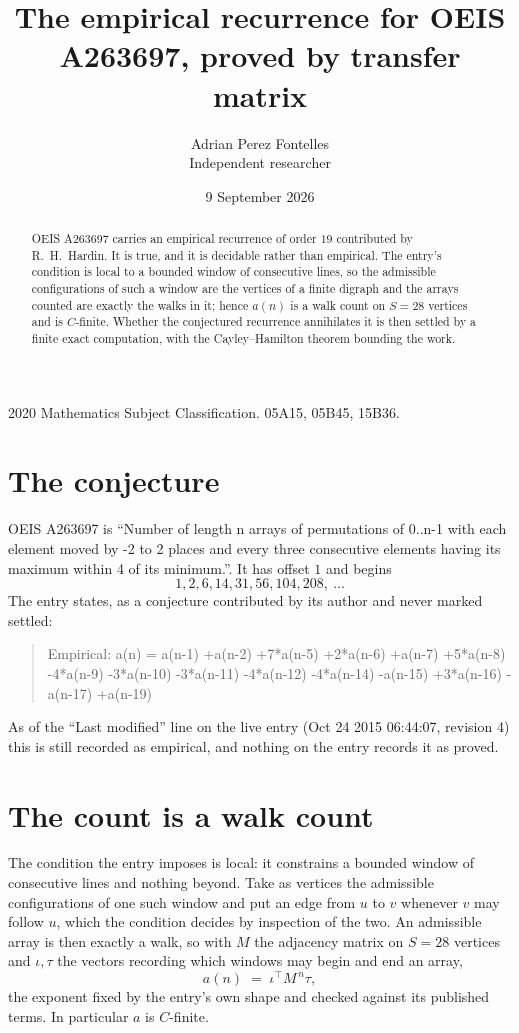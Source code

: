 \documentclass[11pt,a4paper]{article}
\title{The empirical recurrence for OEIS A263697, proved by transfer matrix}
\author{Adrian Perez Fontelles\\ \small Independent researcher}
\date{9 September 2026}
\theoremstyle{plain}
\theoremstyle{definition}
\begin{document}
\maketitle

\begin{abstract}
OEIS A263697 carries an empirical recurrence of order $19$ contributed by R.~H.~Hardin. It is
true, and it is decidable rather than empirical. The entry's condition is local to a bounded window of consecutive lines, so
the admissible configurations of such a window are the vertices of a finite digraph and the
arrays counted are exactly the walks in it; hence $a(n)$ is a walk count on $S=28$ vertices
and is $C$-finite. Whether the conjectured recurrence annihilates it is then settled by a
finite exact computation, with the Cayley--Hamilton theorem bounding the work.
\end{abstract}

\noindent\small 2020 Mathematics Subject Classification. 05A15, 05B45, 15B36.\normalsize

\section{The conjecture}

OEIS A263697 is ``Number of length n arrays of permutations of 0..n-1 with each element moved by -2 to 2 places and every three consecutive elements having its maximum within 4 of its minimum.''. It has offset $1$ and begins
\[
1, 2, 6, 14, 31, 56, 104, 208,\ \dots
\]
The entry states, as a conjecture contributed by its author and never marked settled:
\begin{quote}
Empirical: a(n) = a(n-1) +a(n-2) +7*a(n-5) +2*a(n-6) +a(n-7) +5*a(n-8) -4*a(n-9) -3*a(n-10) -3*a(n-11) -4*a(n-12) -4*a(n-14) -a(n-15) +3*a(n-16) -a(n-17) +a(n-19)
\end{quote}
As of the ``Last modified'' line on the live entry (Oct 24 2015 06:44:07, revision 4) this is still
recorded as empirical, and nothing on the entry records it as proved.

\section{The count is a walk count}

The condition the entry imposes is local: it constrains a bounded window of consecutive lines and nothing beyond. Take as
vertices the admissible configurations of one such window and put an edge from $u$ to $v$
whenever $v$ may follow $u$, which the condition decides by inspection of the two. An
admissible array is then exactly a walk, so with $M$ the adjacency matrix on $S=28$ vertices
and $\iota,\tau$ the vectors recording which windows may begin and end an array,
\[
a(n)\;=\;\iota^{\!\top}M^{\,n}\tau ,
\]
the exponent fixed by the entry's own shape and checked against its published terms. In
particular $a$ is $C$-finite.
\end{document}
